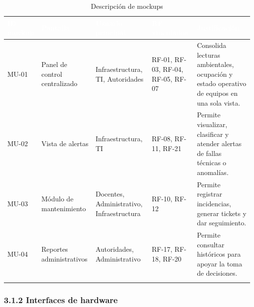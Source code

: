\begingroup
\small
\begin{longtable}{|P{0.2000}|P{0.2000}|P{0.2000}|P{0.2000}|P{0.2000}|}
\hline
{}\textcolor{white}{\textbf{ID mockup}} & \textcolor{white}{\textbf{Pantalla}} & \textcolor{white}{\textbf{Usuario principal}} & \textcolor{white}{\textbf{RF vinculados}} & \textcolor{white}{\textbf{Justificación}} \\ \hline
MU-01 & Panel de control centralizado & Infraestructura, TI, Autoridades & RF-01, RF-03, RF-04, RF-05, RF-07 & Consolida lecturas ambientales, ocupación y estado operativo de equipos en una sola vista. \\ \hline
MU-02 & Vista de alertas & Infraestructura, TI & RF-08, RF-11, RF-21 & Permite visualizar, clasificar y atender alertas de fallas técnicas o anomalías. \\ \hline
MU-03 & Módulo de mantenimiento & Docentes, Administrativo, Infraestructura & RF-10, RF-12 & Permite registrar incidencias, generar tickets y dar seguimiento. \\ \hline
MU-04 & Reportes administrativos & Autoridades, Administrativo & RF-17, RF-18, RF-20 & Permite consultar históricos para apoyar la toma de decisiones. \\ \hline
\caption{Descripción de mockups}
\end{longtable}
\endgroup

\subsubsection*{3.1.2 Interfaces de hardware}



